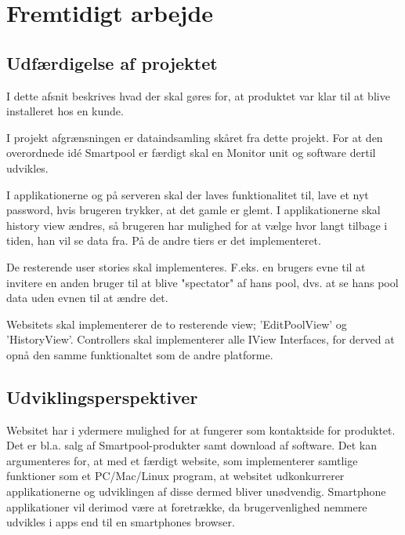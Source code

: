 \chapter{Fremtidigt arbejde}
\section{Udfærdigelse af projektet}
I dette afsnit beskrives hvad der skal gøres for, at produktet var klar til at blive installeret hos en kunde.

I projekt afgrænsningen er dataindsamling skåret fra dette projekt. For at den overordnede idé Smartpool er færdigt skal en Monitor unit og software dertil udvikles.

I applikationerne og på serveren skal der laves funktionalitet til, lave et nyt password, hvis brugeren trykker, at det gamle er glemt.
I applikationerne skal history view ændres, så brugeren har mulighed for at vælge hvor langt tilbage i tiden, han vil se data fra. På de andre tiers er det implementeret.

De resterende user stories skal implementeres. F.eks. en brugers evne til at invitere en anden bruger til at blive "spectator" af hans pool, dvs. at se hans pool data uden evnen til at ændre det.

Websitets skal implementerer de to resterende view; 'EditPoolView' og 'HistoryView'. Controllers skal implementerer alle IView Interfaces, for derved at opnå den samme funktionaltet som de andre platforme.   


\section{Udviklingsperspektiver}
Websitet har i ydermere mulighed for at fungerer som kontaktside for produktet. Det er bl.a. salg af Smartpool-produkter samt download af software. Det kan argumenteres for, at med et færdigt website, som implementerer samtlige funktioner som et PC/Mac/Linux program, at websitet udkonkurrerer applikationerne og udviklingen af disse dermed bliver unødvendig. Smartphone applikationer vil derimod være at foretrække, da brugervenlighed nemmere udvikles i apps end til en smartphones browser.